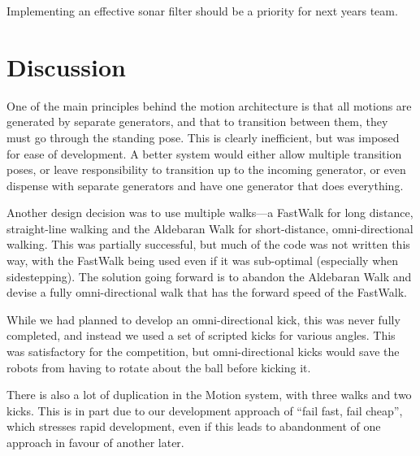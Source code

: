 \documentclass[pdftex,11pt,a4paper]{report}
\begin{document}
Implementing an effective sonar filter should be a priority for next years team.

\section{Discussion}
One of the main principles behind the motion architecture is that all
motions are generated by separate generators, and that to transition
between them, they must go through the standing pose. This is clearly
inefficient, but was imposed for ease of development. A better system would
either allow multiple transition poses, or leave responsibility to
transition up to the incoming generator, or even dispense with separate
generators and have one generator that does everything.

Another design decision was to use multiple walks---a FastWalk for long
distance, straight-line walking and the Aldebaran Walk for short-distance,
omni-directional walking. This was partially successful, but much of the
code was not written this way, with the FastWalk being used even if it was
sub-optimal (especially when sidestepping). The solution going forward is
to abandon the Aldebaran Walk and devise a fully omni-directional walk that
has the forward speed of the FastWalk.

While we had planned to develop an omni-directional kick, this was never
fully completed, and instead we used a set of scripted kicks for various
angles. This was satisfactory for the competition, but omni-directional
kicks would save the robots from having to rotate about the ball before
kicking it.

There is also a lot of duplication in the Motion system, with three walks
and two kicks. This is in part due to our development approach of ``fail
fast, fail cheap'', which stresses rapid development, even if this leads to
abandonment of one approach in favour of another later.
\end{document}
